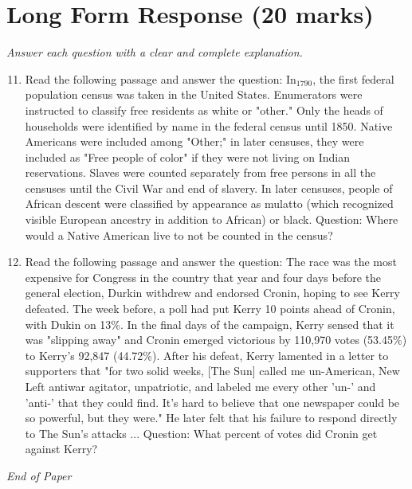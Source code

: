 \documentclass[12pt]{article}
\begin{document}
\section*{Long Form Response (20 marks)}
\textit{Answer each question with a clear and complete explanation.}
\begin{enumerate}[label=\arabic*.]
\setcounter{enumi}{10}
\item Read the following passage and answer the question: In$_{1790}$, the first federal population census was taken in the United States. Enumerators were instructed to classify free residents as white or "other." Only the heads of households were identified by name in the federal census until 1850. Native Americans were included among "Other;" in later censuses, they were included as "Free people of color" if they were not living on Indian reservations. Slaves were counted separately from free persons in all the censuses until the Civil War and end of slavery. In later censuses, people of African descent were classified by appearance as mulatto (which recognized visible European ancestry in addition to African) or black. Question: Where would a Native American live to not be counted in the census?
\item Read the following passage and answer the question: The race was the most expensive for Congress in the country that year and four days before the general election, Durkin withdrew and endorsed Cronin, hoping to see Kerry defeated. The week before, a poll had put Kerry 10 points ahead of Cronin, with Dukin on 13\%. In the final days of the campaign, Kerry sensed that it was "slipping away" and Cronin emerged victorious by 110,970 votes (53.45\%) to Kerry's 92,847 (44.72\%). After his defeat, Kerry lamented in a letter to supporters that "for two solid weeks, [The Sun] called me un-American, New Left antiwar agitator, unpatriotic, and labeled me every other 'un-' and 'anti-' that they could find. It's hard to believe that one newspaper could be so powerful, but they were." He later felt that his failure to respond directly to The Sun's attacks ... Question: What percent of votes did Cronin get against Kerry?
\end{enumerate}

\vfill
\noindent\textit{End of Paper}
\end{document}

